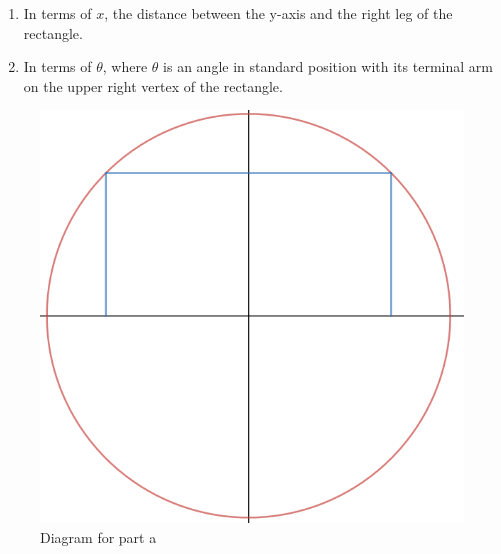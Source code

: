 \documentclass[12pt]{book}
\begin{document}
\begin{enumerate}
\begin{enumerate}
\item In terms of $x$, the distance between the y-axis and the right leg of the rectangle. 
\item In terms of $\theta$, where $\theta$ is an angle in standard position with its terminal arm on the upper right vertex of the rectangle.
\end{enumerate}


\begin{figure}[h]
\centering
\includegraphics[scale=0.25]{Inscribed1.png}
\caption{Diagram for part a}
\end{figure}


\end{enumerate}
\end{document}

